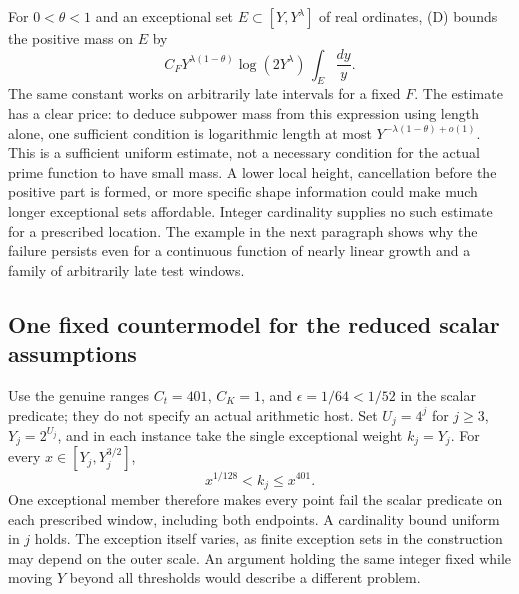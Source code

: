 \documentclass[12pt,letterpaper]{article}
\begin{document}
For \(0<\theta<1\) and an exceptional set \(E\subset[Y,Y^\lambda]\) of real ordinates, (D) bounds the positive mass on \(E\) by
\[
      C_F Y^{\lambda(1-\theta)}\log(2Y^\lambda)\,
                             \int_E\frac{dy}{y}.
\]
The same constant works on arbitrarily late intervals for a fixed \(F\). The estimate has a clear price: to deduce subpower mass from this expression using length alone, one sufficient condition is logarithmic length at most \(Y^{-\lambda(1-\theta)+o(1)}\). This is a sufficient uniform estimate, not a necessary condition for the actual prime function to have small mass. A lower local height, cancellation before the positive part is formed, or more specific shape information could make much longer exceptional sets affordable. Integer cardinality supplies no such estimate for a prescribed location. The example in the next paragraph shows why the failure persists even for a continuous function of nearly linear growth and a family of arbitrarily late test windows.

\subsection{One fixed countermodel for the reduced scalar assumptions}
Use the genuine ranges \(C_t=401\), \(C_K=1\), and \(\epsilon=1/64<1/52\) in the scalar predicate; they do not specify an actual arithmetic host. Set \(U_j=4^j\) for \(j\ge3\), \(Y_j=2^{U_j}\), and in each instance take the single exceptional weight \(k_j=Y_j\). For every \(x\in[Y_j,Y_j^{3/2}]\),
\[
                 x^{1/128}<k_j\le x^{401}.
\]
One exceptional member therefore makes every point fail the scalar predicate on each prescribed window, including both endpoints. A cardinality bound uniform in \(j\) holds. The exception itself varies, as finite exception sets in the construction may depend on the outer scale. An argument holding the same integer fixed while moving \(Y\) beyond all thresholds would describe a different problem.
\end{document}
